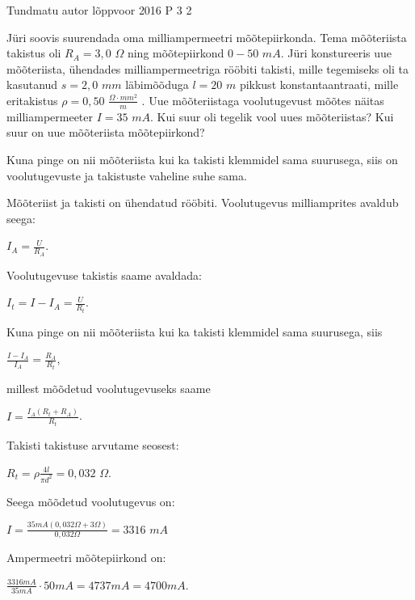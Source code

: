{Tundmatu autor} %
{lõppvoor} %
{2016} %
{P 3} %
{2} %
{

\ifStatement
Jüri soovis suurendada oma milliampermeetri mõõtepiirkonda. Tema mõõteriista takistus oli $R_A = 3,0$ $\Omega$ ning mõõtepiirkond $0 - 50$ $mA$. Jüri konstureeris uue mõõteriista, ühendades milliampermeetriga rööbiti takisti, mille tegemiseks oli ta kasutanud $s = 2,0$ $mm$ läbimõõduga $l = 20$ $m$ pikkust konstantaantraati, mille eritakistus $\rho = 0,50$ $\frac{\Omega \cdot mm^2}{m}$ . Uue mõõteriistaga voolutugevust mõõtes näitas milliampermeeter $I = 35$ $mA$. Kui suur oli tegelik vool uues mõõteriistas? Kui suur on uue mõõteriista mõõtepiirkond?
\fi

\ifHint
Kuna pinge on nii mõõteriista kui ka takisti klemmidel sama suurusega, siis on voolutugevuste ja takistuste vaheline suhe sama.
\fi

\ifSolution
Mõõteriist ja takisti on ühendatud rööbiti. Voolutugevus milliamprites avaldub seega:
\begin{center}
$I_A = \frac{U}{R_A}$.
\end{center}
Voolutugevuse takistis saame avaldada:
\begin{center}
$I_t = I - I_A = \frac{U}{R_t}$.
\end{center}
Kuna pinge on nii mõõteriista kui ka takisti klemmidel sama suurusega, siis
\begin{center}
$\frac{I - I_A}{I_A} = \frac{R_A}{R_t}$,
\end{center}
millest mõõdetud voolutugevuseks saame 
\begin{center}
$I = \frac{I_A (R_t + R_A)}{R_t}$.
\end{center}
Takisti takistuse arvutame seosest:
\begin{center}
$R_t = \rho \frac{4l}{\pi d^2} = 0,032$ $\Omega$.
\end{center}
Seega mõõdetud voolutugevus on:
\begin{center}
$I = \frac{35 mA(0,032 \Omega + 3 \Omega)}{0,032 \Omega} = 3316$ $mA$
\end{center}
Ampermeetri mõõtepiirkond on:
\begin{center}
$\frac{3316 mA}{35 mA} \cdot 50mA = 4737 mA = 4700 mA$.
\end{center}
\fi
}